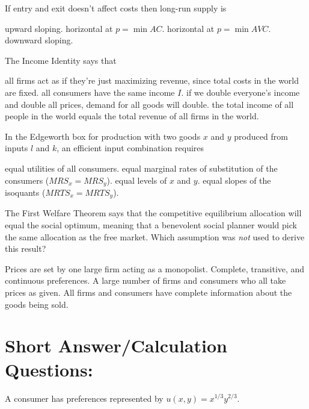 \documentclass[addpoints,answers,12pt]{exam}
\begin{document}
\begin{questions}
\question[1] If entry and exit doesn't affect costs then long-run supply is
\begin{choices}
    \choice upward sloping.
    \CorrectChoice horizontal at $p=\min AC$.
    \choice horizontal at $p=\min AVC$.
    \choice downward sloping.
\end{choices}

\question[1] The Income Identity says that
\begin{choices}
    \choice all firms act as if they're just maximizing revenue, since total costs in the world are fixed.
    \choice all consumers have the same income $I$.
    \choice if we double everyone's income and double all prices, demand for all goods will double.
    \CorrectChoice the total income of all people in the world equals the total revenue of all firms in the world.
\end{choices}

\question[1] In the Edgeworth box for production with two goods $x$ and $y$ produced from inputs $l$ and $k$, an efficient input combination requires
\begin{choices}
    \choice equal utilities of all consumers.
    \choice equal marginal rates of substitution of the consumers ($MRS_x=MRS_y$).
    \choice equal levels of $x$ and $y$.
    \CorrectChoice equal slopes of the isoquants ($MRTS_x=MRTS_y$).
\end{choices}

\question[1] The First Welfare Theorem says that the competitive equilibrium allocation will equal the social optimum, meaning that a benevolent social planner would pick the same allocation as the free market. Which assumption was \textit{not} used to derive this result?
\begin{choices}
    \CorrectChoice Prices are set by one large firm acting as a monopolist.
    \choice Complete, transitive, and continuous preferences.
    \choice A large number of firms and consumers who all take prices as given.
    \choice All firms and consumers have complete information about the goods being sold.
\end{choices}


\newpage

\section*{Short Answer/Calculation Questions:}

\question[10]
A consumer has preferences represented by $u(x,y)=x^{1/3} y^{2/3}$.
\begin{parts}

\end{parts}
\end{questions}
\end{document}
